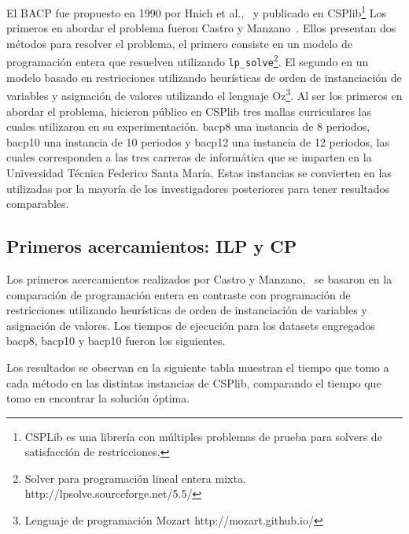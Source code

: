 \documentclass[letterpaper,10pt]{article}
\begin{document}
El BACP fue propuesto en 1990 por Hnich et al.,~\cite{csplibprob030} y publicado en CSPlib\footnote{CSPLib es una librería con múltiples problemas de prueba para solvers de satisfacción de restricciones.}
Los primeros en abordar el problema fueron Castro y Manzano~\cite{DBLP:journals/corr/cs-PL-0110007}. Ellos presentan dos métodos para resolver el problema, el primero consiste en un modelo de programación entera que resuelven utilizando \verb+lp_solve+\footnote{Solver para programación lineal entera mixta. http://lpsolve.sourceforge.net/5.5/}. El segundo en un modelo basado en restricciones utilizando heurísticas de orden de instanciación de variables y asignación de valores utilizando el lenguaje Oz\footnote{Lenguaje de programación Mozart http://mozart.github.io/}. Al ser los primeros en abordar el problema, hicieron público en CSPlib tres mallas curriculares las cuales utilizaron en su experimentación. bacp8 una instancia de 8 periodos, bacp10 una instancia de 10 periodos y bacp12 una instancia de 12 periodos, las cuales corresponden a las tres carreras de informática que se imparten en la Universidad Técnica Federico Santa María. Estas instancias se convierten en las utilizadas por la mayoría de los investigadores posteriores para tener resultados comparables.

\subsection{Primeros acercamientos: ILP y CP}

Los primeros acercamientos realizados por Castro y Manzano,~\cite{DBLP:journals/corr/cs-PL-0110007} se basaron en la comparación de programación entera en contraste con programación de restricciones utilizando heurísticas de orden de instanciación de variables y asignación de valores. Los tiempos de ejecución para los datasets engregados bacp8, bacp10 y bacp10 fueron los siguientes.

Los resultados se observan en la siguiente tabla muestran el tiempo que tomo a cada método en las distintas instancias de CSPlib, comparando el tiempo que tomo en encontrar la solución óptima.
\end{document}
